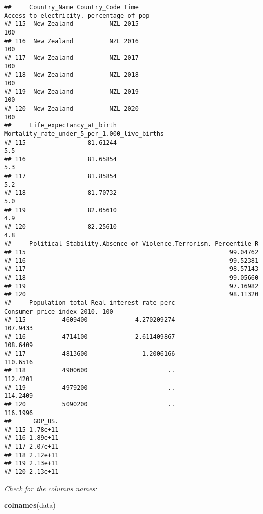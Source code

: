 \documentclass[
]{article}
\newenvironment{Shaded}{\begin{snugshade}}{\end{snugshade}}
\newcommand{\FunctionTok}[1]{\textcolor[rgb]{0.13,0.29,0.53}{\textbf{#1}}}
\newcommand{\NormalTok}[1]{#1}
\begin{document}
\begin{verbatim}
##     Country_Name Country_Code Time Access_to_electricity._percentage_of_pop
## 115  New Zealand          NZL 2015                                      100
## 116  New Zealand          NZL 2016                                      100
## 117  New Zealand          NZL 2017                                      100
## 118  New Zealand          NZL 2018                                      100
## 119  New Zealand          NZL 2019                                      100
## 120  New Zealand          NZL 2020                                      100
##     Life_expectancy_at_birth Mortality_rate_under_5_per_1.000_live_births
## 115                 81.61244                                          5.5
## 116                 81.65854                                          5.3
## 117                 81.85854                                          5.2
## 118                 81.70732                                          5.0
## 119                 82.05610                                          4.9
## 120                 82.25610                                          4.8
##     Political_Stability.Absence_of_Violence.Terrorism._Percentile_R
## 115                                                        99.04762
## 116                                                        99.52381
## 117                                                        98.57143
## 118                                                        99.05660
## 119                                                        97.16982
## 120                                                        98.11320
##     Population_total Real_interest_rate_perc Consumer_price_index_2010._100
## 115          4609400             4.270209274                       107.9433
## 116          4714100             2.611409867                       108.6409
## 117          4813600               1.2006166                       110.6516
## 118          4900600                      ..                       112.4201
## 119          4979200                      ..                       114.2409
## 120          5090200                      ..                       116.1996
##      GDP_US.
## 115 1.78e+11
## 116 1.89e+11
## 117 2.07e+11
## 118 2.12e+11
## 119 2.13e+11
## 120 2.13e+11
\end{verbatim}

\emph{Check for the columns names:}

\begin{Shaded}
\begin{Highlighting}[]
\FunctionTok{colnames}\NormalTok{(data)}
\end{Highlighting}
\end{Shaded}
\end{document}
